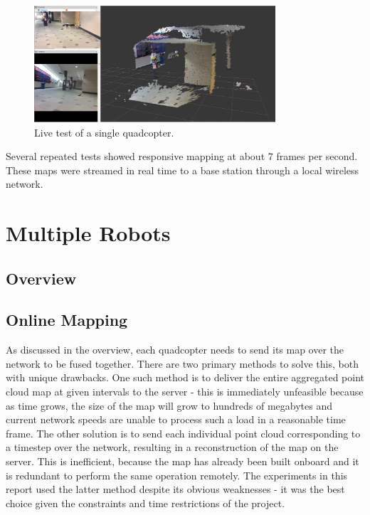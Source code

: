 \documentclass[letterpaper, oneside, 10pt]{report}
\begin{document}
\begin{figure}[h]
 \caption{Live test of a single quadcopter.}
 \centering
   \includegraphics[width=0.8\textwidth]{images/single_test}
\end{figure}

\noindent Several repeated tests showed responsive mapping at about 7 frames per second. These maps were streamed in real time to a base station through a local wireless network.

\chapter{Multiple Robots}

\section{Overview}

\section{Online Mapping}
\noindent As discussed in the overview, each quadcopter needs to send its map over the network to be fused together. There are two primary methods to solve this, both with unique drawbacks. One such method is to deliver the entire aggregated point cloud map at given intervals to the server - this is immediately unfeasible because as time grows, the size of the map will grow to hundreds of megabytes and current network speeds are unable to process such a load in a reasonable time frame. The other solution is to send each individual point cloud corresponding to a timestep over the network, resulting in a reconstruction of the map on the server. This is inefficient, because the map has already been built onboard and it is redundant to perform the same operation remotely. The experiments in this report used the latter method despite its obvious weaknesses - it was the best choice given the constraints and time restrictions of the project.
\end{document}
